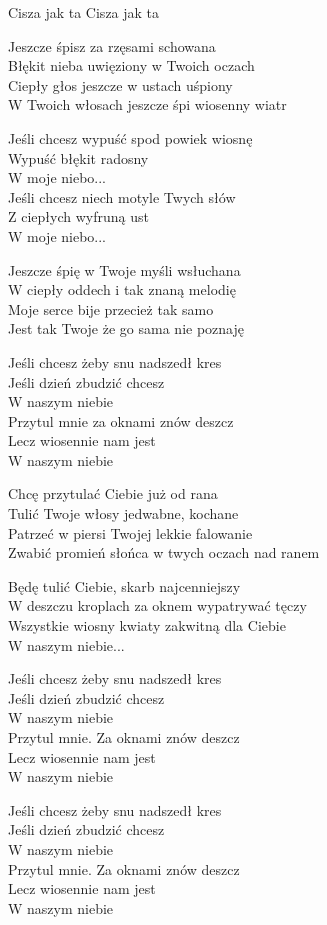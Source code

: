 {Cisza jak ta}
{Cisza jak ta}
\begin{text}
    \hfill\break
Jeszcze śpisz za rzęsami schowana \\
Błękit nieba uwięziony w Twoich oczach \\
Ciepły głos jeszcze w ustach uśpiony \\
W Twoich włosach jeszcze śpi wiosenny wiatr

\vin Jeśli chcesz wypuść spod powiek wiosnę \\
\vin Wypuść błękit radosny \\
\vin W moje niebo... \\
\vin Jeśli chcesz niech motyle Twych słów \\
\vin Z ciepłych wyfruną ust \\
\vin W moje niebo...

    \hfill\break
Jeszcze śpię w Twoje myśli wsłuchana \\
W ciepły oddech i tak znaną melodię \\
Moje serce bije przecież tak samo \\
Jest tak Twoje że go sama nie poznaję

\vin Jeśli chcesz żeby snu nadszedł kres \\
\vin Jeśli dzień zbudzić chcesz \\
\vin W naszym niebie \\
\vin Przytul mnie za oknami znów deszcz \\
\vin Lecz wiosennie nam jest \\
\vin W naszym niebie

    \hfill\break
Chcę przytulać Ciebie już od rana \\
Tulić Twoje włosy jedwabne, kochane \\
Patrzeć w piersi Twojej lekkie falowanie \\
Zwabić promień słońca w twych oczach nad ranem

Będę tulić Ciebie, skarb najcenniejszy \\
W deszczu kroplach za oknem wypatrywać tęczy \\
Wszystkie wiosny kwiaty zakwitną dla Ciebie \\
W naszym niebie...

\vin Jeśli chcesz żeby snu nadszedł kres \\
\vin Jeśli dzień zbudzić chcesz \\
\vin W naszym niebie \\
\vin Przytul mnie. Za oknami znów deszcz \\
\vin Lecz wiosennie nam jest \\
\vin W naszym niebie

\vin Jeśli chcesz żeby snu nadszedł kres \\
\vin Jeśli dzień zbudzić chcesz \\
\vin W naszym niebie \\
\vin Przytul mnie. Za oknami znów deszcz \\
\vin Lecz wiosennie nam jest \\
\vin W naszym niebie
\end{text}
